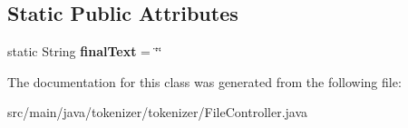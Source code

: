 \subsection*{Static Public Attributes}
\begin{DoxyCompactItemize}
\item 
\hypertarget{classtokenizer_1_1tokenizer_1_1_file_controller_a68619eb967ec8d9e8cee9828d0a013a7}{}static String {\bfseries final\+Text} = \char`\"{}\char`\"{}\label{classtokenizer_1_1tokenizer_1_1_file_controller_a68619eb967ec8d9e8cee9828d0a013a7}

\end{DoxyCompactItemize}


The documentation for this class was generated from the following file\+:\begin{DoxyCompactItemize}
\item 
src/main/java/tokenizer/tokenizer/File\+Controller.\+java\end{DoxyCompactItemize}
